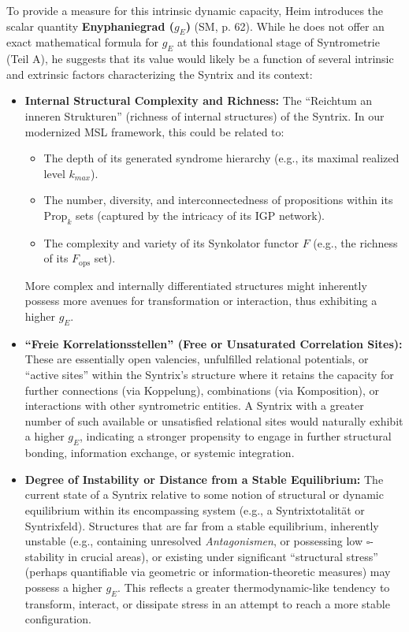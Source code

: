 \documentclass[
    12pt,              %
    a4paper,           %
    headings=normal,   %
    twoside=true,      %
    BCOR=8mm,          %
]{scrbook}
\newcommand{\q}[1]{\enquote{#1}}
\newcommand{\enyphaniegrad}{g_E}
\newcommand{\BoxSyn}{\square}
\newcommand{\Propk}[1]{\text{Prop}_{#1}}
\newcommand{\fops}{F_{\text{ops}}}
\begin{document}
To provide a measure for this intrinsic dynamic capacity, Heim introduces the scalar quantity \textbf{Enyphaniegrad (\(\enyphaniegrad\))} (SM, p. 62). While he does not offer an exact mathematical formula for \(\enyphaniegrad\) at this foundational stage of Syntrometrie (Teil A), he suggests that its value would likely be a function of several intrinsic and extrinsic factors characterizing the Syntrix and its context:

\begin{itemize}
    \item   \textbf{Internal Structural Complexity and Richness:} The \q{Reichtum an inneren Strukturen} (richness of internal structures) of the Syntrix. In our modernized MSL framework, this could be related to:
        \begin{itemize}
            \item The depth of its generated syndrome hierarchy (e.g., its maximal realized level \(k_{max}\)).
            \item The number, diversity, and interconnectedness of propositions within its \(\Propk{k}\) sets (captured by the intricacy of its IGP network).
            \item The complexity and variety of its Synkolator functor \(F\) (e.g., the richness of its \(\fops\) set).
        \end{itemize}
        More complex and internally differentiated structures might inherently possess more avenues for transformation or interaction, thus exhibiting a higher \(\enyphaniegrad\).

    \item   \textbf{\q{Freie Korrelationsstellen} (Free or Unsaturated Correlation Sites):} These are essentially open valencies, unfulfilled relational potentials, or \q{active sites} within the Syntrix's structure where it retains the capacity for further connections (via Koppelung), combinations (via Komposition), or interactions with other syntrometric entities. A Syntrix with a greater number of such available or unsatisfied relational sites would naturally exhibit a higher \(\enyphaniegrad\), indicating a stronger propensity to engage in further structural bonding, information exchange, or systemic integration.

    \item   \textbf{Degree of Instability or Distance from a Stable Equilibrium:} The current state of a Syntrix relative to some notion of structural or dynamic equilibrium within its encompassing system (e.g., a Syntrixtotalität or Syntrixfeld). Structures that are far from a stable equilibrium, inherently unstable (e.g., containing unresolved \textit{Antagonismen}, or possessing low \(\BoxSyn\)-stability in crucial areas), or existing under significant \q{structural stress} (perhaps quantifiable via geometric or information-theoretic measures) may possess a higher \(\enyphaniegrad\). This reflects a greater thermodynamic-like tendency to transform, interact, or dissipate stress in an attempt to reach a more stable configuration.


\end{itemize}
\end{document}
